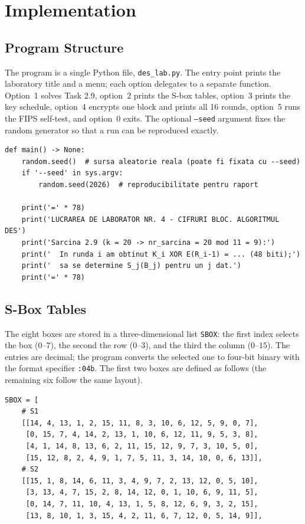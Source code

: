 \documentclass[12pt,a4paper]{article}
\begin{document}
\section{Implementation}

\subsection{Program Structure}

The program is a single Python file, \texttt{des\_lab.py}. The entry point prints the laboratory title and a menu; each option delegates to a separate function. Option~1 solves Task 2.9, option~2 prints the S-box tables, option~3 prints the key schedule, option~4 encrypts one block and prints all 16 rounds, option~5 runs the FIPS self-test, and option~0 exits. The optional \texttt{--seed} argument fixes the random generator so that a run can be reproduced exactly.

\begin{lstlisting}[style=python,caption={Program entry point (\texttt{des\_lab.py})}]
def main() -> None:
    random.seed()  # sursa aleatorie reala (poate fi fixata cu --seed)
    if '--seed' in sys.argv:
        random.seed(2026)  # reproducibilitate pentru raport

    print('=' * 78)
    print('LUCRAREA DE LABORATOR NR. 4 - CIFRURI BLOC. ALGORITMUL DES')
    print('Sarcina 2.9 (k = 20 -> nr_sarcina = 20 mod 11 = 9):')
    print('  In runda i am obtinut K_i XOR E(R_i-1) = ... (48 biti);')
    print('  sa se determine S_j(B_j) pentru un j dat.')
    print('=' * 78)
\end{lstlisting}

\subsection{S-Box Tables}

The eight boxes are stored in a three-dimensional list \texttt{SBOX}: the first index selects the box ($0$--$7$), the second the row ($0$--$3$), and the third the column ($0$--$15$). The entries are decimal; the program converts the selected one to four-bit binary with the format specifier \texttt{:04b}. The first two boxes are defined as follows (the remaining six follow the same layout).

\begin{lstlisting}[style=python,caption={Beginning of the \texttt{SBOX} table (boxes $S_1$ and $S_2$)}]
SBOX = [
    # S1
    [[14, 4, 13, 1, 2, 15, 11, 8, 3, 10, 6, 12, 5, 9, 0, 7],
     [0, 15, 7, 4, 14, 2, 13, 1, 10, 6, 12, 11, 9, 5, 3, 8],
     [4, 1, 14, 8, 13, 6, 2, 11, 15, 12, 9, 7, 3, 10, 5, 0],
     [15, 12, 8, 2, 4, 9, 1, 7, 5, 11, 3, 14, 10, 0, 6, 13]],
    # S2
    [[15, 1, 8, 14, 6, 11, 3, 4, 9, 7, 2, 13, 12, 0, 5, 10],
     [3, 13, 4, 7, 15, 2, 8, 14, 12, 0, 1, 10, 6, 9, 11, 5],
     [0, 14, 7, 11, 10, 4, 13, 1, 5, 8, 12, 6, 9, 3, 2, 15],
     [13, 8, 10, 1, 3, 15, 4, 2, 11, 6, 7, 12, 0, 5, 14, 9]],
\end{lstlisting}
\end{document}
